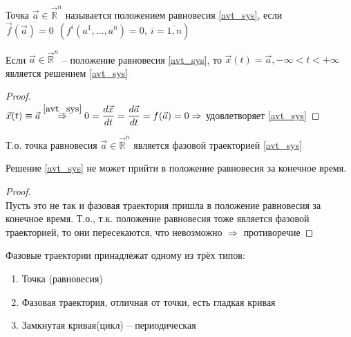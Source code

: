 \begin{definition}
	Точка $\vec{a} \in \vec{\mathbb{R}}^n$ называется положением равновесия \eqref{avt_sys}, если \\ $ \vec{f}(\vec{a}) = 0 \ \ (f^i(a^1, ..., a^n) = 0, \ i = \overline{1, n} )$
\end{definition}

\begin{proposition}
	Если $ \vec{a} \in \vec{\mathbb{R}}^n $ -- положение равновесия \eqref{avt_sys}, то $ \vec{x}(t) = \vec{a}, -\infty < t < + \infty$ является решением \eqref{avt_sys}
\end{proposition}

\begin{proof}
	\ \\
	$\vec{x}(t) \equiv \vec{a} \overset{\eqref{avt_sys}}{\Rightarrow} 0 = \dfrac{d\vec{x}}{dt} = \dfrac{d \vec{a}}{dt} = f(\vec{a}) = 0 \Rightarrow$ удовлетворяет \eqref{avt_sys}
\end{proof}
\noindent Т.о. точка равновесия $ \vec{a} \in \vec{\mathbb{R}}^n$ является фазовой траекторией \eqref{avt_sys}

\begin{corollary}
	Решение \eqref{avt_sys} не может прийти в положение равновесия за конечное время.
\end{corollary}

\begin{proof}
	\ \\
	Пусть это не так и фазовая траектория пришла в положение равновесия за конечное время. Т.о., т.к. положение равновесия тоже является фазовой траекторией, то они пересекаются, что невозможно $\Rightarrow$ противоречие 
\end{proof}

\begin{theorem}
	Фазовые траектории принадлежат одному из трёх типов:
	\begin{enumerate}
		\item Точка (равновесия)
		\item Фазовая траектория, отличная от точки, есть гладкая кривая
		\item Замкнутая кривая(цикл) -- периодическая
	\end{enumerate}
\end{theorem}
